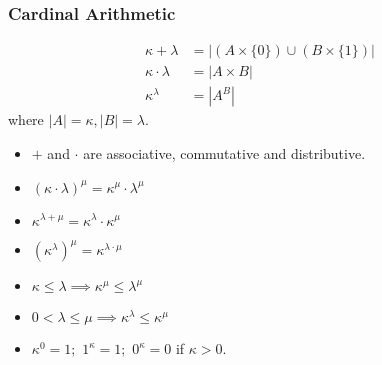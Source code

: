 \documentclass[UTF8,aspectratio=43,11pt,colorlinks,compress,openany]{beamer}%
\begin{document}
\begin{frame}\frametitle{Cardinal Arithmetic}
\setlength\abovedisplayskip{0pt}
\setlength\belowdisplayskip{0pt}
	\begin{definition}
		\begin{align*}
		\kappa+\lambda&=|\left(A\times\{0\}\right)\cup\left(B\times\{1\}\right)|\\
		\kappa\cdot\lambda&=|A\times B|\\
		\kappa^\lambda&=|A^B|
		\end{align*}
		where $|A|=\kappa, |B|=\lambda$.
	\end{definition}
	\begin{theorem}
		\begin{itemize}
			\item $+$ and $\cdot$ are associative, commutative and distributive.
			\item $(\kappa\cdot\lambda)^\mu=\kappa^\mu\cdot\lambda^\mu$
			\item $\kappa^{\lambda+\mu}=\kappa^\lambda\cdot\kappa^\mu$
			\item $(\kappa^\lambda)^\mu=\kappa^{\lambda\cdot\mu}$
			\item $\kappa\leq\lambda\implies\kappa^\mu\leq\lambda^\mu$
			\item $0<\lambda\leq\mu\implies\kappa^\lambda\leq\kappa^\mu$
			\item $\kappa^0=1;$ $1^\kappa=1;$ $0^\kappa=0$ if $\kappa>0$.
		\end{itemize}
	\end{theorem}
\end{frame}
\end{document}
